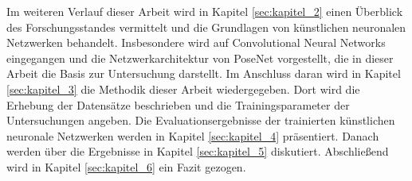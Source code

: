Im weiteren Verlauf dieser Arbeit wird in Kapitel \ref{sec:kapitel_2} einen Überblick des Forschungsstandes vermittelt und die Grundlagen von künstlichen neuronalen Netzwerken behandelt. Insbesondere wird auf Convolutional Neural Networks eingegangen und die Netzwerkarchitektur von PoseNet vorgestellt, die in dieser Arbeit die Basis zur Untersuchung darstellt. Im Anschluss daran wird in Kapitel \ref{sec:kapitel_3} die Methodik dieser Arbeit wiedergegeben. Dort wird die Erhebung der Datensätze beschrieben und die Trainingsparameter der Untersuchungen angeben. Die Evaluationsergebnisse der trainierten künstlichen neuronale Netzwerken werden in Kapitel \ref{sec:kapitel_4} präsentiert. Danach werden über die Ergebnisse in Kapitel \ref{sec:kapitel_5} diskutiert. Abschließend wird in Kapitel \ref{sec:kapitel_6} ein Fazit gezogen. 


